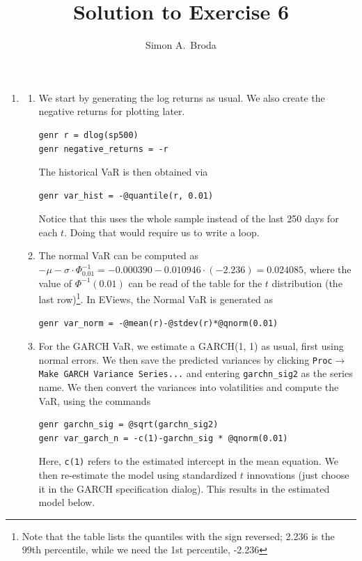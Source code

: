 \documentclass[11pt, a4paper]{article}
\begin{document}
\title{Solution to Exercise 6}
\author{Simon A.\ Broda}
\date{}
\maketitle

\begin{enumerate}


\item
\begin{enumerate}
\item We start by generating the log returns as usual. We also create the negative returns for plotting later.
\begin{verbatim}
genr r = dlog(sp500)
genr negative_returns = -r
\end{verbatim}
The historical VaR is then obtained via
\begin{verbatim}
genr var_hist = -@quantile(r, 0.01)
\end{verbatim}
Notice that this uses the whole sample instead of the last 250 days for each $t$. Doing that would require us to write a loop.
\item The normal VaR can be computed as $-\mu-\sigma\cdot\Phi^{-1}_{0.01}=-0.000390 -0.010946 \cdot (-2.236)=0.024085$, where the value of $\Phi^{-1}(0.01)$ can be read of the table for the $t$ distribution (the last row)\footnote{Note that the table lists the quantiles with the sign reversed; 2.236 is the 99th percentile, while we need the 1st percentile, -2.236}. In EViews, the Normal VaR  is generated as
\begin{verbatim}
genr var_norm = -@mean(r)-@stdev(r)*@qnorm(0.01)
\end{verbatim}
\item For the GARCH VaR, we estimate a GARCH(1, 1) as usual, first using normal errors. We then save the predicted variances by clicking \texttt{Proc$\rightarrow$Make GARCH Variance Series...} and entering \verb.garchn_sig2. as the series name. We then convert the variances into volatilities and compute the VaR, using the commands
\begin{verbatim}
genr garchn_sig = @sqrt(garchn_sig2)
genr var_garch_n = -c(1)-garchn_sig * @qnorm(0.01)
\end{verbatim}
Here, \texttt{c(1)} refers to the estimated intercept in the mean equation. We then re-estimate the model using standardized $t$ innovations (just choose it in the GARCH specification dialog). This results in the estimated model below.
\begin{center}

\end{center}
\end{enumerate}
\end{enumerate}
\end{document}
